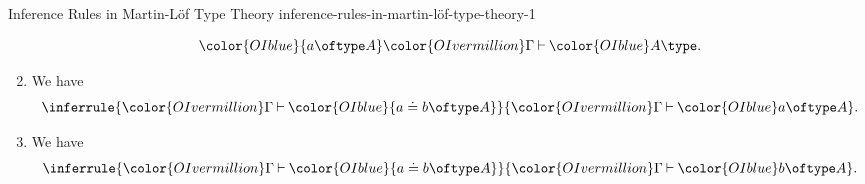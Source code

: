 \begin{definition}{Inference Rules in Martin-Löf Type Theory \rmI}{inference-rules-in-martin-löf-type-theory-1}
\begin{enumerate}
\[{                    {\color{OIblue}{a\oftype A}}%
                }{%
                    {\color{OIvermillion}\Gamma}%
                    \mathbin{\vdash}%
                    {\color{OIblue}A\type}%
                }.%
            \]%
        \item\label{inference-rules-in-martin-löf-type-theory-1-formation-of-judgemental-equality-of-terms-1}We have
            \[
                \inferrule{%
                    {\color{OIvermillion}\Gamma}%
                    \mathbin{\vdash}%
                    {\color{OIblue}{a\doteq b\oftype A}}%
                }{%
                    {\color{OIvermillion}\Gamma}%
                    \mathbin{\vdash}%
                    {\color{OIblue}a\oftype A}%
                }.%
            \]%
        \item\label{inference-rules-in-martin-löf-type-theory-1-formation-of-judgemental-equality-of-terms-3}We have
            \[
                \inferrule{%
                    {\color{OIvermillion}\Gamma}%
                    \mathbin{\vdash}%
                    {\color{OIblue}{a\doteq b\oftype A}}%
                }{%
                    {\color{OIvermillion}\Gamma}%
                    \mathbin{\vdash}%
                    {\color{OIblue}b\oftype A}%
                }.%
            \]%
    \end{enumerate}
\end{definition}
